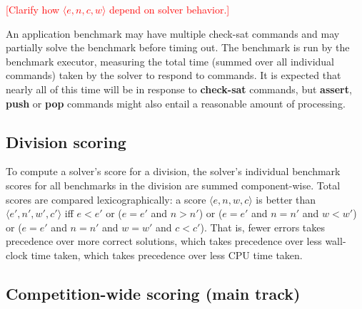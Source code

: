 \documentclass[12pt]{article}
\newcommand{\akey}[1]{\textbf{#1}}
\newcommand{\remark}[1]{{\small\textcolor{red}{[#1]}}}
\begin{document}
%
\remark{Clarify how $\langle e, n, c, w\rangle$ depend on solver
  behavior.}

%
An application benchmark may have multiple check-sat commands and may
partially solve the benchmark before timing out.  The benchmark is run
by the benchmark executor, measuring the total time (summed over all
individual commands) taken by the solver to respond to commands. It is
expected that nearly all of this time will be in response to
\akey{check-sat} commands, but \akey{assert}, \akey{push} or
\akey{pop} commands might also entail a reasonable amount of
processing.

\subsection{Division scoring}

To compute a solver's score for a division, the solver's individual
benchmark scores for all benchmarks in the division are summed
component-wise.  Total scores are compared lexicographically: a score
$\langle e, n, w, c\rangle$ is better than $\langle e', n', w',
c'\rangle$ iff $e < e'$ or ($e = e'$ and $n > n'$) or ($e = e'$ and $n
= n'$ and $w < w'$) or ($e = e'$ and $n = n'$ and $w = w'$ and $c <
c'$).  That is, fewer errors takes precedence over more correct
solutions, which takes precedence over less wall-clock time taken,
which takes precedence over less CPU time taken.

\subsection{Competition-wide scoring (main track)}
\end{document}
